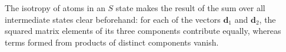 The isotropy of atoms in an $S$ state makes the result of the sum over all intermediate states clear beforehand: for each of the vectors $\mathbf d_1$ and $\mathbf d_2$, the squared matrix elements of its three components contribute equally, whereas terms formed from products of distinct components vanish.
